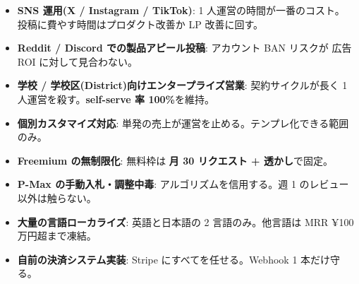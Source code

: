 \documentclass{article}
\newcommand{\hl}[1]{\textcolor{cAlert}{\textbf{#1}}}
\begin{document}
\begin{tcolorbox}[colback=red!5,colframe=red!50!black,title=\textbf{\textcolor{cAlert}{意識的に避ける施策}}]
\begin{itemize}[leftmargin=1.4em,itemsep=3pt]
  \item \hl{SNS 運用(X / Instagram / TikTok)}: 1 人運営の時間が一番のコスト。
        投稿に費やす時間はプロダクト改善か LP 改善に回す。
  \item \hl{Reddit / Discord での製品アピール投稿}: アカウント BAN リスクが
        広告 ROI に対して見合わない。
  \item \hl{学校 / 学校区(District)向けエンタープライズ営業}: 契約サイクルが長く
        1 人運営を殺す。\textbf{self-serve 率 100\%}を維持。
  \item \hl{個別カスタマイズ対応}: 単発の売上が運営を止める。テンプレ化できる範囲のみ。
  \item \hl{Freemium の無制限化}: 無料枠は \textbf{月 30 リクエスト + 透かし}で固定。
  \item \hl{P-Max の手動入札・調整中毒}: アルゴリズムを信用する。週 1 のレビュー以外は触らない。
  \item \hl{大量の言語ローカライズ}: 英語と日本語の 2 言語のみ。他言語は MRR ¥100 万円超まで凍結。
  \item \hl{自前の決済システム実装}: Stripe にすべてを任せる。Webhook 1 本だけ守る。
\end{itemize}
\end{tcolorbox}

\end{document}
